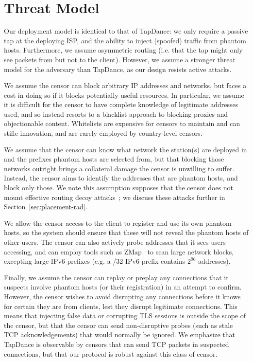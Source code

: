 \documentclass[sigconf]{acmart}
\begin{document}




\section{Threat Model}


Our deployment model is identical to that of TapDance: we only require a passive
tap at the deploying ISP, and the ability to inject (spoofed) traffic from phantom
hosts.
Furthermore, we assume
asymmetric routing (i.e. that the tap might only see packets from but not to the
client).
However, we assume a stronger threat model for the adversary than
TapDance, as our design resists active attacks.


We assume the censor can block arbitrary IP addresses and networks, but faces a
cost in doing so if it blocks potentially useful resources. In particular, we
assume it is difficult for the censor to have complete knowledge of legitimate
addresses used, and so instead resorts to a blacklist approach to blocking
proxies and objectionable content.
Whitelists are expensive for censors to maintain and can stifle
innovation, and are rarely employed by country-level censors.


We assume that the censor can know what network the \scheme station(s) are
deployed in and the prefixes phantom hosts are selected from, but that blocking those
networks outright brings a collateral
damage the censor is unwilling to suffer. Instead, the censor aims to identify
the addresses that are phantom hosts, and block only those. We note this
assumption supposes that the censor does not mount effective routing
decoy attacks~\cite{rad12,true-cost-rad}; we discuss these attacks further in Section~\ref{sec:placement-rad}.

We allow the censor access to the client to register and use its own phantom hosts, 
so the system should ensure that these will not reveal the phantom hosts of other users. The
censor can also actively probe addresses that it sees users accessing, and can
employ tools such as ZMap~\cite{zmap13} to scan large network blocks, excepting
large IPv6 prefixes (e.g. a /32 IPv6 prefix contains $2^{96}$ addresses).

Finally, we assume the censor can replay or preplay any connections that it
suspects involve phantom hosts (or their registration) in an attempt to confirm.
However, the censor wishes to avoid disrupting any connections before it
knows for certain they are from \scheme clients, lest they disrupt legitimate
connections. This means that injecting false data or corrupting TLS sessions is
outside the scope of the censor, but that the censor can send non-disruptive
probes (such as stale TCP acknowledgements) that would normally
be ignored. We emphasize that TapDance is observable by censors that can send
TCP packets in suspected connections, but that our protocol is robust against
this class of censor.
\end{document}
